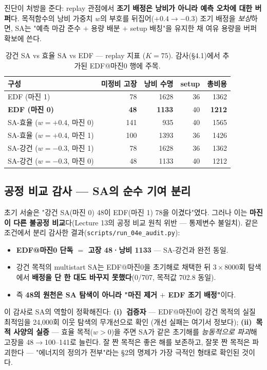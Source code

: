\documentclass[11pt]{article}
\begin{document}
진단이 처방을 준다: replay 관점에서 \textbf{조기 배정은 낭비가 아니라 예측 오차에 대한 버퍼}다.
목적함수의 낭비 가중치 $w$의 부호를 뒤집어($+0.4 \to -0.3$) 조기 배정을 \emph{보상}하면,
SA는 "예측 마감 준수 $+$ 용량 배분 $+$ setup 배칭"을 유지한 채 여유 용량을 버퍼 확보에 쓴다.

\begin{table}[H]
\centering
\caption{강건 SA vs 효율 SA vs EDF — replay 지표 ($K{=}75$). 감사(\S4.1)에서 추가된 EDF@마진0 행에 주목.}
\label{tab:robust}
\begin{tabular}{lrrrr}
\toprule
구성 & 미정비 고장 & 낭비 수명 & setup & 총비용 \\
\midrule
EDF (마진 1) & 78 & 1628 & 36 & 1362 \\
\textbf{EDF (마진 0)} & \textbf{48} & \textbf{1133} & 40 & \textbf{1212} \\
SA-효율 ($w{=}{+}0.4$, 마진 0) & 141 & 935 & 40 & 1565 \\
SA-효율 ($w{=}{+}0.4$, 마진 1) & 100 & 1393 & 36 & 1426 \\
SA-강건 ($w{=}{-}0.3$, 마진 1) & 78 & 1628 & 36 & 1362 \\
SA-강건 ($w{=}{-}0.3$, 마진 0) & 48 & 1133 & 40 & 1212 \\
\bottomrule
\end{tabular}
\end{table}

\subsection{공정 비교 감사 — SA의 순수 기여 분리}
\label{sec:audit}

초기 서술은 "강건 SA(마진 0) 48이 EDF(마진 1) 78을 이겼다"였다.
그러나 이는 \textbf{마진이 다른 불공정 비교}다(Lecture 13의 공정 비교 원칙 위반 — 통제변수 불일치).
같은 조건에서 분리 감사한 결과(\texttt{scripts/run\_04e\_audit.py}):

\begin{itemize}[nosep]
  \item \textbf{EDF@마진0 단독 $=$ 고장 48·낭비 1133} — SA-강건과 완전 동일.
  \item 강건 목적의 multistart SA는 EDF@마진0을 초기해로 채택한 뒤 $3{\times}8000$회 탐색에서
        \textbf{배정을 단 한 대도 바꾸지 못했다}(0/707, 목적값 702.8 동일).
  \item 즉 \textbf{48의 원천은 SA 탐색이 아니라 "마진 제거 $+$ EDF 조기 배정"}이다.
\end{itemize}

이 감사로 SA의 역할이 정확해진다:
\textbf{(i)~검증자} — EDF@마진0이 강건 목적의 실질 최적임을 24{,}000회 이웃 탐색의 무개선으로 확인
(개선 실패는 여기서 정보다);
\textbf{(ii)~목적 사양의 실증} — 효율 목적($w{>}0$)을 주면 SA가 같은 초기해를 \emph{능동적으로 파괴}해
고장을 48$\to$100--141로 늘린다. 잘 짠 목적은 좋은 해를 보존하고, 잘못 짠 목적은 파괴한다 —
"에너지의 정의가 전부"라는 \S2의 명제가 가장 극적인 형태로 확인된 것이다.
\end{document}
